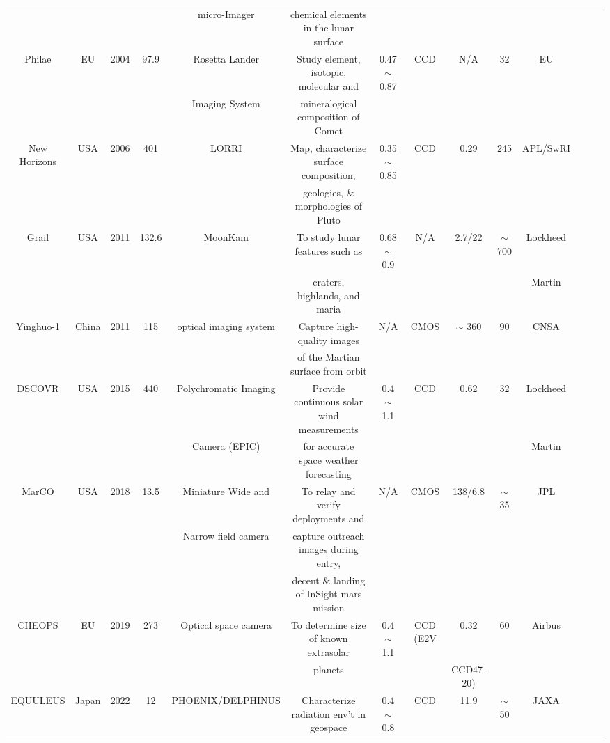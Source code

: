 \documentclass[final,5p,times,twocolumn,authoryear]{elsarticle}
\begin{document}
\begin{table}
{\begin{tabular}{c c c c c c c c c c c c c c}
			& & & & micro-Imager & chemical elements in the lunar surface & & &  & & & &\\
			Philae & EU & 2004 & 97.9 & Rosetta Lander & Study element, isotopic, molecular and &0.47 $\sim$ 0.87 & CCD & N/A & 32 & EU & \citep{bibring2007rosetta, boehnhardt2017philae}\\
			& & & & Imaging System & mineralogical composition of Comet &  & & & & & &\\
			New Horizons & USA & 2006 & 401 & LORRI & Map, characterize surface composition, & 0.35 $\sim$ 0.85 & CCD & 0.29 & 245 &  APL/SwRI& \citep{stern2015pluto, weaver2009overview}\\
			& & & & & geologies, $\&$ morphologies of Pluto & & & & & & &\\
			Grail & USA & 2011 & 132.6 & MoonKam & To study lunar features such as  & 0.68 $\sim$ 0.9 & N/A & 2.7/22 & $\sim$ 700  & Lockheed& \citep{zuber2013gravity, williams2014lunar}\\
			& & & & & craters, highlands, and maria  & & & & &  Martin&\\
			Yinghuo-1 & China & 2011 & 115 & optical imaging system & Capture high-quality images & N/A & CMOS & $\sim$ 360 & 90  & CNSA & \citep{zheng2013china, hua2008yinghuo}\\
			& & & & & of the Martian surface from orbit & & & & & & &\\
			DSCOVR & USA & 2015 & 440 & Polychromatic Imaging & Provide continuous solar wind measurements  & 0.4 $\sim$ 1.1 & CCD & 0.62 & 32   & Lockheed & \citep{eoportal, marshak2018earth}\\
			& & & & Camera (EPIC) & for accurate space weather forecasting& & &  & &  Martin &\\
			MarCO & USA & 2018 & 13.5 & Miniature Wide and & To relay and verify deployments and  & N/A & CMOS & 138/6.8 & $\sim$ 35 &  JPL & \citep{schoolcraft2017marco, jpl2018}\\
			& & & & Narrow field camera & capture outreach images during entry, & & & & & && &\\
			& & & & & decent $\&$ landing of InSight mars mission & & & & && & &\\
			CHEOPS & EU & 2019 & 273 & Optical space camera & To determine size of known extrasolar  & 0.4 $\sim$ 1.1 & CCD (E2V & 0.32 & 60 &  Airbus & \citep{broeg2013cheops, fortier2014cheops}\\
			& & & & & planets & & & CCD47-20) & & & & \\
			EQUULEUS & Japan & 2022 & 12 & PHOENIX/DELPHINUS  & Characterize radiation env't in geospace & 0.4 $\sim$ 0.8 & CCD & 11.9 & $\sim$50 &  JAXA & \citep{funase2020mission, ikari2019solar}\\

\end{tabular}}
\end{table}
\end{document}
